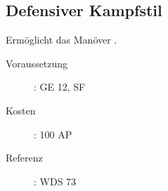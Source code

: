\subsection{Defensiver Kampfstil}
\label{sf.defensiver_kampfstil}
Ermöglicht das Manöver .
\begin{description}
    \item[Voraussetzung]:
        GE 12, SF 
    \item [Kosten]:
        100 AP
    \item [Referenz]:
        WDS 73
\end{description}
